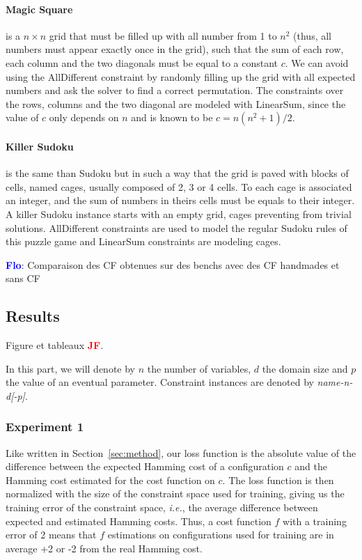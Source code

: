 \documentclass{article}
\newcommand{\ie}{\textit{i.e.}}
\newcommand{\flo}{\textcolor{blue}{\bf Flo}\xspace}
\newcommand{\jf}{\textcolor{red}{\bf JF}\xspace}
\begin{document}
\paragraph{Magic Square} is a $n \times n$ grid that must be filled up
with all number from 1 to $n^2$ (thus, all numbers must appear exactly
once in the grid), such that the  sum of each row, each column and the
two diagonals must be equal to a constant $c$.  We can avoid using the
AllDifferent  constraint by  randomly  filling up  the  grid with  all
expected numbers and ask the solver to find a correct permutation. The
constraints over  the rows, columns  and the two diagonal  are modeled
with LinearSum,  since the  value of  $c$ only depends  on $n$  and is
known to be $c = n(n^2 + 1)/2$.

\paragraph{Killer Sudoku}  is the same than  Sudoku but in such  a way
that the  grid is  paved with  blocks of  cells, named  cages, usually
composed of 2, 3  or 4 cells.  To each cage  is associated an integer,
and  the sum  of  numbers in  theirs  cells must  be  equals to  their
integer. A  killer Sudoku  instance starts with  an empty  grid, cages
preventing from  trivial solutions. AllDifferent constraints  are used
to model  the regular Sudoku rules  of this puzzle game  and LinearSum
constraints are modeling cages.

\flo: Comparaison des  CF obtenues sur des  benchs avec des CF  handmades et
sans CF

\subsection{Results}
Figure et tableaux \jf.

In this part, we  will denote by $n$ the number  of variables, $d$ the
domain size  and $p$  the value of  an eventual  parameter. Constraint
instances are denoted by \textit{name-n-d[-p]}.

\subsubsection{Experiment 1}


Like  written in  Section~\ref{sec:method}, our  loss function  is the
absolute value of the difference  between the expected Hamming cost of
a  configuration $c$  and  the  Hamming cost  estimated  for the  cost
function on $c$. The loss function is then normalized with the size of
the constraint space  used for training, giving us  the training error
of the constraint space, \ie,  the average difference between expected
and  estimated  Hamming costs.   Thus,  a  cost  function $f$  with  a
training error  of 2  means that  $f$ estimations  on configurations
used for training are in average +2 or -2 from the real Hamming cost.
\end{document}
